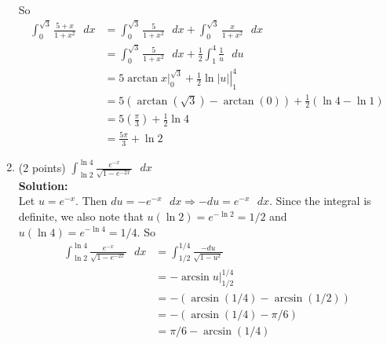 \documentclass[paper=a4, fontsize=11pt]{scrartcl} %
\numberwithin{equation}{section} %
\numberwithin{figure}{section} %
\numberwithin{table}{section} %
\begin{document}
\begin{enumerate}
So
\begin{align*}
\int_0^{\sqrt{3}} \frac{5+x}{1+x^2} \text{ } dx &= \int_0^{\sqrt{3}} \frac{5}{1+x^2} \text{ } dx + \int_0^{\sqrt{3}} \frac{x}{1+x^2} \text{ } dx\\
&= \int_0^{\sqrt{3}} \frac{5}{1+x^2} \text{ } dx + \frac{1}{2}\int_1^4  \frac{1}{u}\text{ } du\\
&=  \left.5\arctan x\right|_0^{\sqrt{3}} + \left.\frac{1}{2}\ln|u|\right|_1^4\\
&= 5(\arctan(\sqrt{3}) - \arctan(0)) +  \frac{1}{2}(\ln 4 - \ln 1)\\
&= 5\left(\frac{\pi}{3}\right) +  \frac{1}{2}\ln 4\\
&= \frac{5\pi}{3} + \ln 2
\end{align*}

\item (2 points) $\displaystyle \int_{\ln 2}^{\ln 4} \frac{e^{-x}}{\sqrt{1-e^{-2x}}} \text{ } dx$\\
\noindent\textbf{Solution:}\\
Let $u = e^{-x}$.  Then $du = -e^{-x}\text{ }dx \Longrightarrow -du = e^{-x}\text{ } dx$.  Since the integral is definite, we also note that $u(\ln 2) = e^{-\ln 2} = 1/2$ and $u(\ln 4) = e^{-\ln 4} = 1/4$.  So
\begin{align*}
\int_{\ln 2}^{\ln 4} \frac{e^{-x}}{\sqrt{1-e^{-2x}}} \text{ } dx &=
\int_{1/2}^{1/4} \frac{-du}{\sqrt{1-u^2}}\\
&= -\arcsin u|_{1/2}^{1/4}\\
&=-(\arcsin(1/4) - \arcsin(1/2))\\
&= -(\arcsin(1/4) - \pi/6)\\
&= \pi/6 - \arcsin(1/4)
\end{align*}

\end{enumerate}

\end{document}
